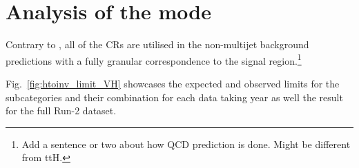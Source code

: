 



\section{Analysis of the \texorpdfstring{\VH}{VH} mode}
\label{sec:htoinv_analysis_VH}

Contrary to \ttH, all of the \glspl{CR} are utilised in the non-multijet background predictions with a fully granular correspondence to the signal region.\footnote{Add a sentence or two about how QCD prediction is done. Might be different from ttH.}

Fig.~\ref{fig:htoinv_limit_VH} showcases the expected and observed limits for the \VH subcategories and their combination for each data taking year as well the result for the full Run-2 dataset.


